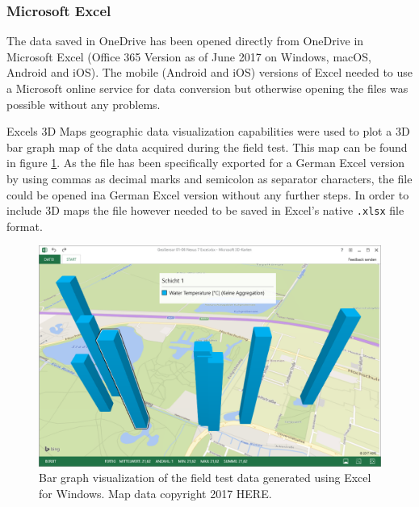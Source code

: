 \subsubsection{Microsoft Excel}
The data saved in OneDrive has been opened directly from OneDrive in Microsoft Excel (Office 365 Version as of June 2017 on Windows, macOS, Android and iOS). The mobile (Android and iOS) versions of Excel needed to use a Microsoft online service for data conversion but otherwise opening the files was possible without any problems.

Excels 3D Maps geographic data visualization capabilities were used to plot a 3D bar graph map of the data acquired during the field test. This map can be found in figure \ref{fig:excel_bar_graph}. As the file has been specifically exported for a German Excel version by using commas as decimal marks and semicolon as separator characters, the file could be opened ina German Excel version without any further steps. In order to include 3D maps the file however needed to be saved in Excel's native \texttt{.xlsx} file format.

\begin{figure}[ht]
\centering
\includegraphics[width=1.0\textwidth]{src/excel_bar_graph.png}
\caption{Bar graph visualization of the field test data generated using Excel for Windows. Map data copyright 2017 HERE.}
\label{fig:excel_bar_graph}
\end{figure}

